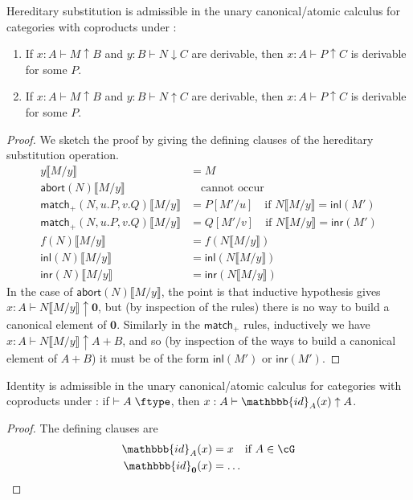 \documentclass{book}
\let\types\vdash
\def\type{\;\ftype}
\newcommand{\atom}{\mathrel{\downarrow}}
\newcommand{\can}{\mathrel{\uparrow}}
\newcommand{\hsub}[1]{\llbracket #1\rrbracket}
\newcommand{\hid}[1]{\mathbbb{id}_{#1}}
\def\inl{\mathsf{inl}}
\def\inr{\mathsf{inr}}
\def\case{\mathsf{match}_+}
\def\emptyt{\mathbf{0}}
\def\abort{\mathsf{abort}}
\begin{document}
\begin{thm}\label{thm:catcoprod-atomcan-subadm}
  Hereditary substitution is admissible in the unary canonical/atomic calculus for categories with coproducts under \cG:
  \begin{enumerate}
  \item If $x:A\types M\can B$ and $y:B\types N\atom C$ are derivable, then $x:A\types P\can C$ is derivable for some $P$.\label{item:catcoprod-atomcan-subadm-1}
  \item If $x:A\types M\can B$ and $y:B\types N\can C$ are derivable, then $x:A\types P\can C$ is derivable for some $P$.\label{item:catcoprod-atomcan-subadm-2}
  \end{enumerate}
\end{thm}
\begin{proof}
  We sketch the proof by giving the defining clauses of the hereditary substitution operation.
  \begin{align*}
    y\hsub{M/y} &= M\\
    \abort(N)\hsub{M/y} &\quad \text{cannot occur}\\
    \case(N,u.P,v.Q)\hsub{M/y} &= P[M'/u] \quad\text{if } N\hsub{M/y}=\inl(M')\\
    \case(N,u.P,v.Q)\hsub{M/y} &= Q[M'/v] \quad\text{if } N\hsub{M/y}=\inr(M')\\
    f(N)\hsub{M/y} &= f(N\hsub{M/y})\\
    \inl(N)\hsub{M/y} &= \inl(N\hsub{M/y})\\
    \inr(N)\hsub{M/y} &= \inr(N\hsub{M/y})
  \end{align*}
  In the case of $\abort(N)\hsub{M/y}$, the point is that inductive hypothesis gives $x:A\types N\hsub{M/y}\can \emptyt$, but (by inspection of the rules) there is no way to build a canonical element of $\emptyt$.
  Similarly in the $\case$ rules, inductively we have $x:A \types N\hsub{M/y}\can A+B$, and so (by inspection of the ways to build a canonical element of $A+B$) it must be of the form $\inl(M')$ or $\inr(M')$.
\end{proof}

\begin{thm}
  Identity is admissible in the unary canonical/atomic calculus for categories with coproducts under \cG: if $\types A\type$, then $x:A \types \hid{A}(x)\can A$.
\end{thm}
\begin{proof}
  The defining clauses are
  \begin{align*}
    \hid{A}(x) &= x \quad\text{if }A\in \cG\\
    \hid{\emptyt}(x) &= \dots
  \end{align*}
\end{proof}
\end{document}
